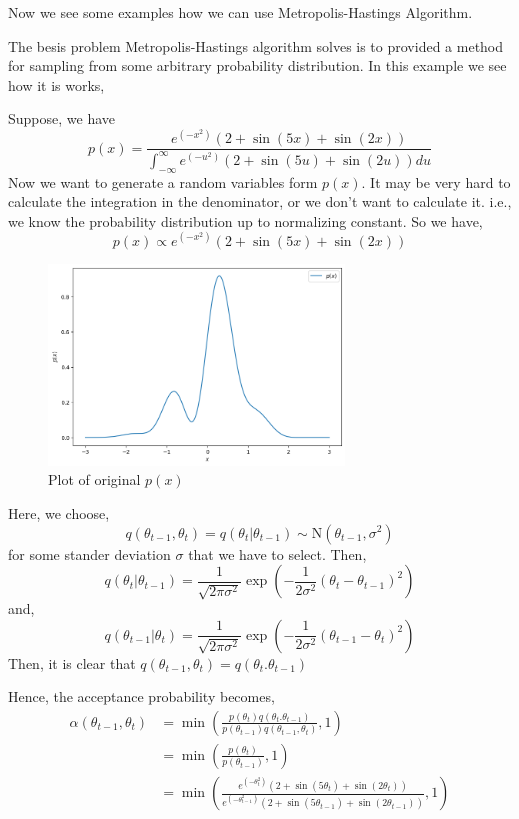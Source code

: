 Now we see some examples how we can use Metropolis-Hastings Algorithm.

\begin{example}
	The besis problem Metropolis-Hastings algorithm solves is to provided a method for sampling from some arbitrary probability distribution. In this example we see how it is works,

	Suppose, we have
	\[
		p(x) = \frac{e^{(-x^2)} \left( 2 + \sin(5x) + \sin(2x) \right) }{ \int_{-\infty}^{\infty} e^{(-u^2)} \left( 2 + \sin(5u) + \sin(2u) \right) du }
	\]
	Now we want to generate a random variables form $ p(x) $. It may be very hard to calculate the integration in the denominator, or we don't want to calculate it. i.e., we know the probability distribution up to normalizing constant.
	So we have,
	\[
		p(x) \propto e^{(-x^2)} \left( 2 + \sin(5x) + \sin(2x) \right)
	\]
	\begin{figure}[H]
		\centering
		\includegraphics[width=0.7\textwidth]{./images/metropolis/example1/plot-of-px.png}
		\caption{Plot of original $p(x)$}
		\label{plot of px}
	\end{figure}

	Here, we choose,
	\[
		q(\theta_{t-1}, \theta_{t}) = q(\theta_t|\theta_{t-1}) \sim \text{N}(\theta_{t-1},\sigma^2)
	\]
	for some stander deviation $ \sigma $ that we have to select.
	Then,
	\[
		q(\theta_{t} | \theta_{t-1}) = \frac{1}{\sqrt{2 \pi \sigma^2}} \exp \left( - \frac{1}{2 \sigma^2} (\theta_t - \theta_{t-1})^2 \right)
	\]
	and,
	\[
		q(\theta_{t-1}|\theta_t) = \frac{1}{\sqrt{2 \pi \sigma^2}} \exp \left( - \frac{1}{2 \sigma^2} (\theta_{t-1} - \theta_{t})^2 \right)
	\]
	Then, it is clear that $ q(\theta_{t-1},\theta_t) = q(\theta_t.\theta_{t-1}) $

	Hence, the acceptance probability becomes,
	\begin{align*}
		\alpha(\theta_{t-1},\theta_{t}) & = \min \left(  \frac{p(\theta_t)q(\theta_t.\theta_{t-1})}{p(\theta_{t-1})q(\theta_{t-1},\theta_t)}  , 1 \right)                                                        \\
		                                & = \min \left( \frac{p(\theta_t)}{p(\theta_{t-1})} , 1 \right)                                                                                                          \\
		                                & = \min \left( \frac{e^{(-\theta_t^2)}(2 + \sin(5 \theta_t) + \sin(2 \theta_t)) }{e^{(-\theta_{t-1}^2)}(2 + \sin(5 \theta_{t-1}) + \sin(2 \theta_{t-1})) }  , 1 \right)
	\end{align*}


\end{example}
